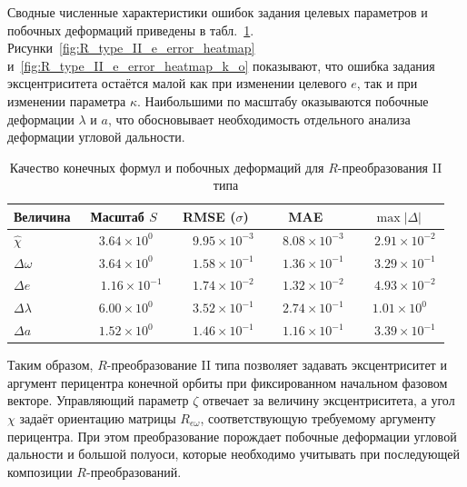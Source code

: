 Сводные численные характеристики ошибок задания целевых параметров и побочных деформаций приведены в табл.~\ref{tab:R_type_II_metrics}. Рисунки~\ref{fig:R_type_II_e_error_heatmap} и~\ref{fig:R_type_II_e_error_heatmap_k_o} показывают, что ошибка задания эксцентриситета остаётся малой как при изменении целевого \(e\), так и при изменении параметра \(\kappa\). Наибольшими по масштабу оказываются побочные деформации \(\lambda\) и \(a\), что обосновывает необходимость отдельного анализа деформации угловой дальности.

\begin{table}
	\caption{Качество конечных формул и побочных деформаций для $R$-преобразования II типа}
	\label{tab:R_type_II_metrics}
	\begin{tabular}{lcccc}
		\toprule
		Величина & Масштаб $S$ & RMSE ($\sigma$) & MAE & $\max |\Delta|$ \\
		\midrule
		$\widehat{\chi}$ & $\phantom{-}3.64\times10^{0\phantom{-}}$ & $\phantom{-}9.95\times10^{-3}$ & $\phantom{-}8.08\times10^{-3}$ & $\phantom{-}2.91\times10^{-2}$ \\
		$\Delta\omega$ & $\phantom{-}3.64\times10^{0\phantom{-}}$ & $\phantom{-}1.58\times10^{-1}$ & $\phantom{-}1.36\times10^{-1}$ & $\phantom{-}3.29\times10^{-1}$ \\
		$\Delta e$ & $\phantom{-}1.16\times10^{-1}$ & $\phantom{-}1.74\times10^{-2}$ & $\phantom{-}1.32\times10^{-2}$ & $\phantom{-}4.93\times10^{-2}$ \\
		$\Delta\lambda$ & $\phantom{-}6.00\times10^{0\phantom{-}}$ & $\phantom{-}3.52\times10^{-1}$ & $\phantom{-}2.74\times10^{-1}$ & $\phantom{-}1.01\times10^{0\phantom{-}}$ \\
		$\Delta a$ & $\phantom{-}1.52\times10^{0\phantom{-}}$ & $\phantom{-}1.46\times10^{-1}$ & $\phantom{-}1.16\times10^{-1}$ & $\phantom{-}3.39\times10^{-1}$ \\
		\bottomrule
	\end{tabular}
\end{table}


Таким образом, \(R\)-преобразование II типа позволяет задавать эксцентриситет и аргумент перицентра конечной орбиты при фиксированном начальном фазовом векторе. Управляющий параметр \(\zeta\) отвечает за величину эксцентриситета, а угол \(\chi\) задаёт ориентацию матрицы \(R_{e\omega}\), соответствующую требуемому аргументу перицентра. При этом преобразование порождает побочные деформации угловой дальности и большой полуоси, которые необходимо учитывать при последующей композиции \(R\)-преобразований.

